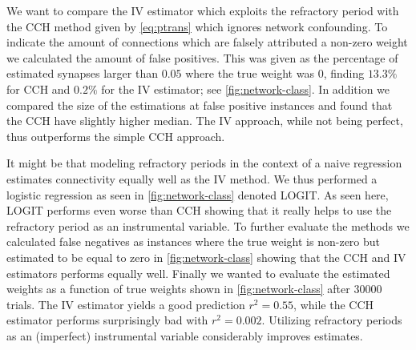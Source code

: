 \documentclass[11pt]{article}
\begin{document}
We want to compare the IV estimator which exploits the refractory period with the CCH method given by \cref{eq:ptrans} which ignores network confounding. To indicate the amount of connections which are falsely attributed a non-zero weight we calculated the amount of false positives. This was given as the percentage of estimated synapses larger than $ 0.05 $ where the true weight was $ 0 $, finding $ 13.3\% $ for CCH and $ 0.2\% $ for the IV estimator; see \cref{fig:network-class}. In addition we compared the size of the estimations at false positive instances and found that the CCH have slightly higher median. The IV approach, while not being perfect, thus outperforms the simple CCH approach.

It might be that modeling refractory periods in the context of a naive regression estimates connectivity equally well as the IV method. We thus performed a logistic regression as seen in \cref{fig:network-class} denoted LOGIT. As seen here, LOGIT performs even worse than CCH showing that it really helps to use the refractory period as an instrumental variable. To further evaluate the methods we calculated false negatives as instances where the true weight is non-zero but estimated to be equal to zero in \cref{fig:network-class} showing that the CCH and IV estimators performs equally well. Finally we wanted to evaluate the estimated weights as a function of true weights shown in \cref{fig:network-class} after 30000 trials. The IV estimator yields a good prediction $ r^2 = 0.55 $, while the CCH estimator performs surprisingly bad with $ r^2 = 0.002 $. Utilizing refractory periods as an (imperfect) instrumental variable considerably improves estimates.
\end{document}
